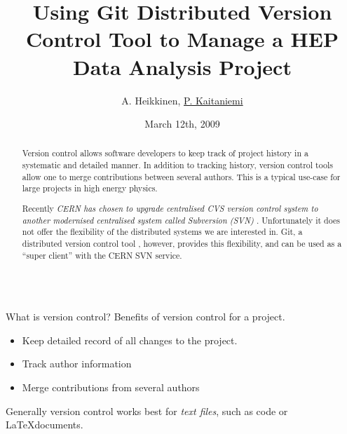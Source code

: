\documentclass[final,hyperref={pdfpagelabels=false},notitlepage=true]{beamer}
\title[]{\Huge Using Git Distributed Version Control Tool to Manage a HEP Data Analysis Project}
\author{A. Heikkinen\inst{1}, \underline{P. Kaitaniemi\inst{1,2}}}
\institute[] %
{
  \inst{1}%
  Helsinki Institute of Physics P.O.Box 64 (Gustaf H\"allstr\"omin katu 2), FIN-00014 University of Helsinki, Finland
  \\
  \inst{2}%
  CEN-Saclay, CEA-IRFU/SPhN, 91 191 Gif sur Yvette, France
}
\date[March 12th, 2009]{March 12th, 2009}
\begin{document}
  \begin{frame}{} 
    \begin{center}
    \maketitle
    \end{center}
    \vfill
    \begin{abstract}
Version control allows software developers to keep track of project history in
a systematic and detailed manner. 
In addition to tracking history, version control tools allow
one to merge contributions between several authors.
This is a typical use-case for large projects in high energy physics.


\vspace{2cm}
Recently \emph{CERN has chosen to upgrade centralised CVS version control
system \cite{cernsvn} to another modernised centralised system called Subversion (SVN)} \cite{svnsite}.
Unfortunately it does not offer the flexibility of the
distributed systems we are interested in. 
Git, a distributed version control tool \cite{torvalds}, however, 
provides this flexibility, 
and can be used as a ``super client'' with the CERN SVN service.




    \end{abstract}
    \begin{columns}[t]
      \begin{column}{0.45\linewidth}

    \begin{block}{\large What is version control?}
      Benefits of version control for a project.
      \begin{itemize}
        \item Keep detailed record of all changes to the project.
        \item Track author information
        \item Merge contributions from several authors
      \end{itemize}
      Generally version control works best for \emph{text files}, such
      as code or \LaTeX documents.


\end{block}
\end{column}
\end{columns}
\end{frame}
\end{document}
